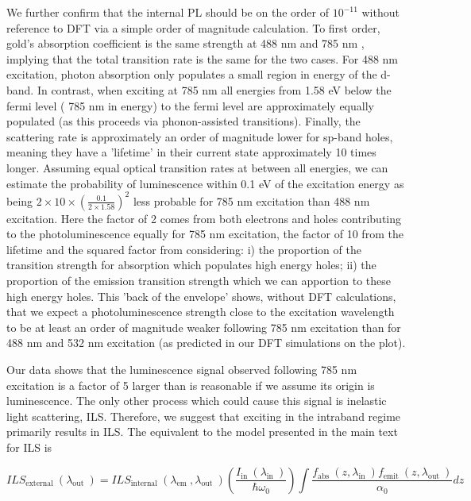 \documentclass[10pt]{article}
\begin{document}
We further confirm that the internal PL should be on the order of $10^{-11}$ without reference to DFT via a simple order of magnitude calculation. To first order, gold's absorption coefficient is the same strength at 488 nm and 785 nm , implying that the total transition rate is the same for the two cases. For 488 nm excitation, photon absorption only populates a small region in energy of the d-band. In contrast, when exciting at 785 nm all energies from 1.58 eV below the fermi level ( 785 nm in energy) to the fermi level are approximately equally populated (as this proceeds via phonon-assisted transitions). Finally, the scattering rate is approximately an order of magnitude lower for sp-band holes, meaning they have a 'lifetime' in their current state approximately 10 times longer. Assuming equal optical transition rates at between all energies, we can estimate the probability of luminescence within 0.1 eV of the excitation energy as being $2 \times 10 \times\left(\frac{0.1}{2 \times 1.58}\right)^{2}$ less probable for 785 nm excitation than 488 nm excitation. Here the factor of 2 comes from both electrons and holes contributing to the photoluminescence equally for 785 nm excitation, the factor of 10 from the lifetime and the squared factor from considering: i) the proportion of the transition strength for absorption which populates high energy holes; ii) the proportion of the emission transition strength which we can apportion to these high energy holes. This 'back of the envelope' shows, without DFT calculations, that we expect a photoluminescence strength close to the excitation wavelength to be at least an order of magnitude weaker following 785 nm excitation than for 488 nm and 532 nm excitation (as predicted in our DFT simulations on the plot).

Our data shows that the luminescence signal observed following 785 nm excitation is a factor of 5 larger than is reasonable if we assume its origin is luminescence. The only other process which could cause this signal is inelastic light scattering, ILS. Therefore, we suggest that exciting in the intraband regime primarily results in ILS. The equivalent to the model presented in the main text for ILS is

$$
I L S_{\text {external }}\left(\lambda_{\text {out }}\right)=I L S_{\text {internal }}\left(\lambda_{\text {em }}, \lambda_{\text {out }}\right)\left(\frac{I_{\text {in }}\left(\lambda_{\text {in }}\right)}{\hbar \omega_{0}}\right) \int \frac{f_{\text {abs }}\left(z, \lambda_{\text {in }}\right) f_{\text {emit }}\left(z, \lambda_{\text {out }}\right)}{\alpha_{0}} d z
$$
\end{document}
